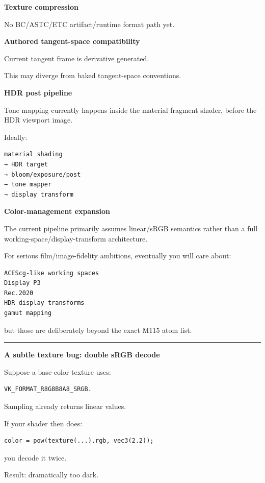 \textbf{Texture compression}

No BC/ASTC/ETC artifact/runtime format path yet.

\textbf{Authored tangent-space compatibility}

Current tangent frame is derivative generated.

This may diverge from baked tangent-space conventions.

\textbf{HDR post pipeline}

Tone mapping currently happens inside the material fragment shader, before the HDR viewport image.

Ideally:

\begin{verbatim}
material shading
→ HDR target
→ bloom/exposure/post
→ tone mapper
→ display transform
\end{verbatim}

\textbf{Color-management expansion}

The current pipeline primarily assumes linear/sRGB semantics rather than a full working-space/display-transform architecture.

For serious film/image-fidelity ambitions, eventually you will care about:

\begin{verbatim}
ACEScg-like working spaces
Display P3
Rec.2020
HDR display transforms
gamut mapping
\end{verbatim}

but those are deliberately beyond the exact M115 atom list.

\begin{center}\rule{0.5\linewidth}{0.5pt}\end{center}

\textbf{A subtle texture bug: double sRGB decode}

Suppose a base-color texture uses:

\begin{verbatim}
VK_FORMAT_R8G8B8A8_SRGB.
\end{verbatim}

Sampling already returns linear values.

If your shader then does:

\begin{verbatim}
color = pow(texture(...).rgb, vec3(2.2));
\end{verbatim}

you decode it twice.

Result: dramatically too dark.

